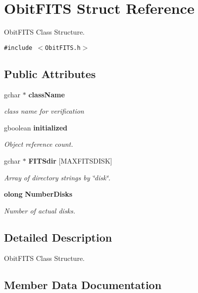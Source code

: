 \section{Obit\-FITS Struct Reference}
\label{structObitFITS}
Obit\-FITS Class Structure.  


{\tt \#include $<$Obit\-FITS.h$>$}

\subsection*{Public Attributes}
\begin{CompactItemize}
\item 
gchar $\ast$ {\bf class\-Name}
\begin{CompactList}\small\item\em class name for verification \item\end{CompactList}\item 
gboolean {\bf initialized}
\begin{CompactList}\small\item\em Object reference count. \item\end{CompactList}\item 
gchar $\ast$ {\bf FITSdir} [MAXFITSDISK]
\begin{CompactList}\small\item\em Array of directory strings by \char`\"{}disk\char`\"{}. \item\end{CompactList}\item 
{\bf olong} {\bf Number\-Disks}
\begin{CompactList}\small\item\em Number of actual disks. \item\end{CompactList}\end{CompactItemize}


\subsection{Detailed Description}
Obit\-FITS Class Structure. 



\subsection{Member Data Documentation}
